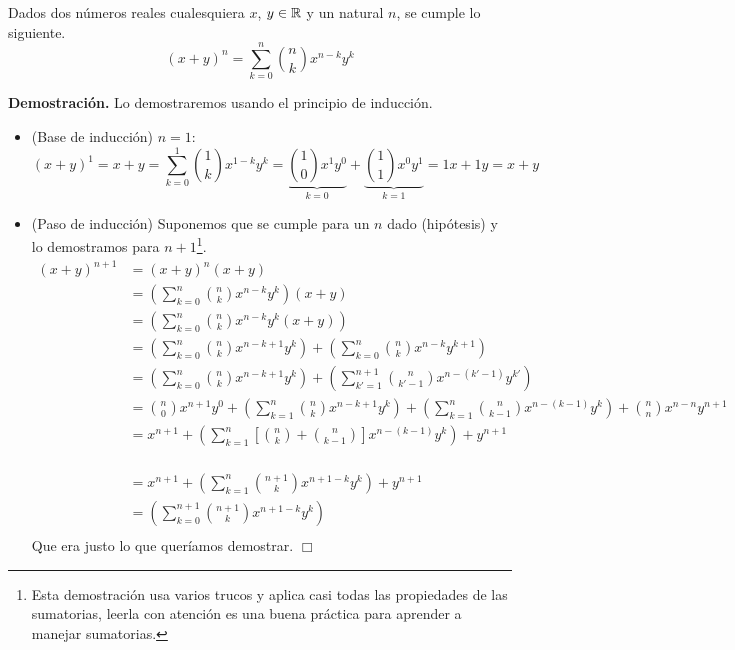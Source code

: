 \begin{thm}
  Dados dos números reales cualesquiera $x$, $y\in\mathbb{R}$ y un natural $n$, se cumple lo siguiente.
	$$(x+y)^n = \sum_{k=0}^n \binom{n}{k}x^{n-k}y^{k}$$
\end{thm}
{\bf Demostración.}
Lo demostraremos usando el principio de inducción.
\begin{itemize}
\item (Base de inducción) $n=1$:
  $$(x+y)^1=x+y=\sum_{k=0}^1{1\choose k}x^{1-k}y^{k}=\underbrace{{1\choose0}x^1y^0}_{k=0}+\underbrace{{1\choose1}x^0y^1}_{k=1}=1x+1y=x+y$$
\item (Paso de inducción) Suponemos que se cumple para un $n$ dado (hipótesis) y lo demostramos para $n+1$\footnote{Esta demostración usa varios trucos y aplica casi todas las propiedades de las sumatorias, leerla con atención es una buena práctica para aprender a manejar sumatorias.}.
\begin{align*}
  (x+y)^{n+1} &= (x+y)^n (x+y)\\
  &= \left(\sum_{k=0}^n \binom{n}{k}x^{n-k}y^{k}\right) (x+y)\\
  &= \left(\sum_{k=0}^n \binom{n}{k}x^{n-k}y^{k}(x+y)\right)\\
  &= \left(\sum_{k=0}^n \binom{n}{k}x^{n-k+1}y^{k}\right)+
  \left(\sum_{k=0}^n \binom{n}{k}x^{n-k}y^{k+1}\right)\\
  &= \left(\sum_{k=0}^n \binom{n}{k}x^{n-k+1}y^{k}\right)+
  \left(\sum_{k'=1}^{n+1} \binom{n}{k'-1}x^{n-(k'-1)}y^{k'}\right)\\
  &= {n\choose 0} x^{n+1}y^0+\left(\sum_{k=1}^n \binom{n}{k}x^{n-k+1}y^{k}\right)+
  \left(\sum_{k=1}^{n} \binom{n}{k-1}x^{n-(k-1)}y^{k}\right)+{n\choose n}x^{n-n}y^{n+1}\\
  &= x^{n+1}+\left(\sum_{k=1}^n \left[\binom{n}{k}+ \binom{n}{k-1}\right]x^{n-(k-1)}y^{k}\right)+y^{n+1}\\
\end{align*}

\begin{align*}
  \phantom{(x+y)^{n+1}}
  &= x^{n+1}+\left(\sum_{k=1}^n \binom{n+1}{k}x^{n+1-k}y^{k}\right)+y^{n+1}\phantom{  \left(\sum_{k=1}^{n} \binom{n}{k-1}x^{n-(k-1)}y^{k}\right)+{n\choose n}x^{n-n}y^{n+1}}\\
  &= \left(\sum_{k=0}^{n+1} \binom{n+1}{k}x^{n+1-k}y^{k}\right)\\
\end{align*}
Que era justo lo que queríamos demostrar. \hfill $\Box$
\end{itemize}

